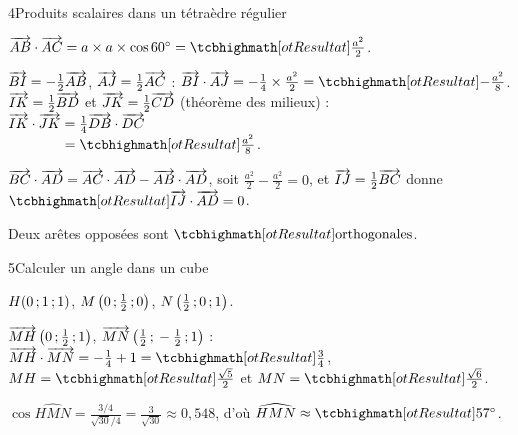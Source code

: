 \begin{deuxcolonnes}
\begin{corrige}{4}{Produits scalaires dans un tétraèdre régulier}
\begin{questions}
  \item $\vect{AB}\cdot\vect{AC}=a\times a\times\cos60^\circ=\res{\tfrac{a^2}{2}}$.
  \item $\overrightarrow{BI}=-\frac12\overrightarrow{AB}$, $\overrightarrow{AJ}=\frac12\overrightarrow{AC}$ : $\vect{BI}\cdot\vect{AJ}=-\frac14\times\frac{a^2}2=\res{-\tfrac{a^2}{8}}$.
    $\overrightarrow{IK}=\frac12\overrightarrow{BD}$ et $\overrightarrow{JK}=\frac12\overrightarrow{CD}$ (théorème des milieux) :\\
    $\overrightarrow{IK}\cdot\overrightarrow{JK}=\frac14\overrightarrow{DB}\cdot\overrightarrow{DC}$\\ $\phantom{\vect{IK}\cdot\vect{JK}}=\res{\tfrac{a^2}{8}}$.
  \item $\overrightarrow{BC}\cdot\overrightarrow{AD}=\overrightarrow{AC}\cdot\overrightarrow{AD}-\overrightarrow{AB}\cdot\overrightarrow{AD}$, soit $\frac{a^2}2-\frac{a^2}2=0$, et
    $\overrightarrow{IJ}=\frac12\overrightarrow{BC}$ donne $\res{\vect{IJ}\cdot\vect{AD}=0}$.
  \item Deux arêtes opposées sont $\res{\text{orthogonales}}$.
\end{questions}
\end{corrige}

\begin{corrige}{5}{Calculer un angle dans un cube}
\begin{questions}
  \item $H(0\,{;}\,1\,{;}\,1)$, $M\left(0\,{;}\,\frac12\,{;}\,0\right)$, $N\left(\frac12\,{;}\,0\,{;}\,1\right)$.
  \item $\overrightarrow{MH}\left(0\,{;}\,\frac12\,{;}\,1\right)$, $\overrightarrow{MN}\left(\frac12\,{;}\,-\frac12\,{;}\,1\right)$ :\\
    $\vect{MH}\cdot\vect{MN}=-\frac14+1=\res{\tfrac34}$,\\ $MH=\res{\tfrac{\sqrt5}{2}}$ et $MN=\res{\tfrac{\sqrt6}{2}}$.
  \item $\cos\widehat{HMN}=\frac{3/4}{\sqrt{30}/4}=\frac{3}{\sqrt{30}}\approx0{,}548$, d'où $\widehat{HMN}\approx\res{57^\circ}$.
\end{questions}
\end{corrige}


\end{deuxcolonnes}

